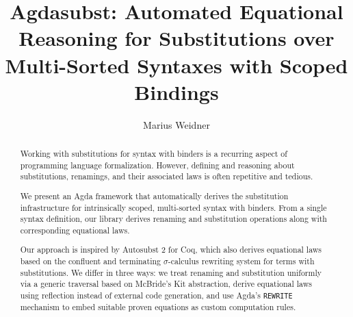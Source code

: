 \documentclass[screen,nonacm]{acmart}
\begin{document}
\title{Agdasubst: Automated Equational Reasoning for Substitutions over Multi-Sorted Syntaxes with Scoped Bindings}

\author{Marius Weidner}

\begin{abstract}

  Working with substitutions for syntax with binders is a recurring aspect of
  programming language formalization. However, defining and reasoning about
  substitutions, renamings, and their associated laws is often repetitive and
  tedious.

  We present an Agda framework that automatically derives the substitution
  infrastructure for intrinsically scoped, multi-sorted syntax with binders. From
  a single syntax definition, our library derives renaming and substitution
  operations along with corresponding equational laws.

  Our approach is inspired by Autosubst 2 for Coq, which also derives equational
  laws based on the confluent and terminating \(\sigma\)-calculus rewriting
  system for terms with substitutions. We differ in three ways: we treat renaming
  and substitution uniformly via a generic traversal based on McBride’s Kit
  abstraction, derive equational laws using reflection instead of external code
  generation, and use Agda’s \texttt{REWRITE} mechanism to embed suitable proven
  equations as custom computation rules.
\end{abstract}
\end{document}

